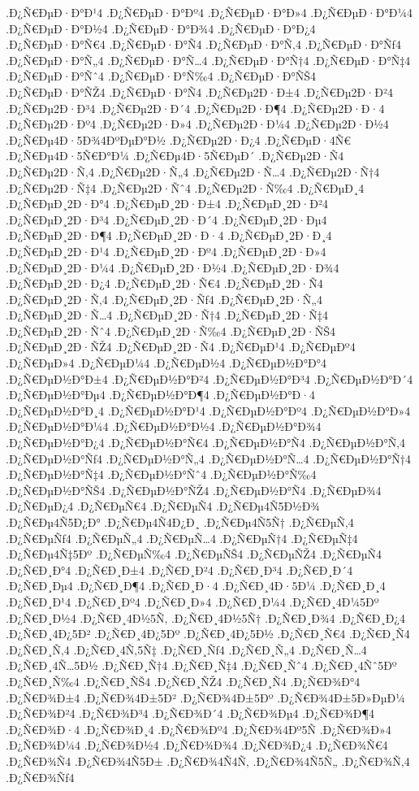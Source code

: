 {.Ð¿Ñ€ÐµÐ·Ð°Ð¹4
.Ð¿Ñ€ÐµÐ·Ð°Ðº4
.Ð¿Ñ€ÐµÐ·Ð°Ð»4
.Ð¿Ñ€ÐµÐ·Ð°Ð¼4
.Ð¿Ñ€ÐµÐ·Ð°Ð½4
.Ð¿Ñ€ÐµÐ·Ð°Ð¾4
.Ð¿Ñ€ÐµÐ·Ð°Ð¿4
.Ð¿Ñ€ÐµÐ·Ð°Ñ€4
.Ð¿Ñ€ÐµÐ·Ð°Ñ4
.Ð¿Ñ€ÐµÐ·Ð°Ñ‚4
.Ð¿Ñ€ÐµÐ·Ð°Ñƒ4
.Ð¿Ñ€ÐµÐ·Ð°Ñ„4
.Ð¿Ñ€ÐµÐ·Ð°Ñ…4
.Ð¿Ñ€ÐµÐ·Ð°Ñ†4
.Ð¿Ñ€ÐµÐ·Ð°Ñ‡4
.Ð¿Ñ€ÐµÐ·Ð°Ñˆ4
.Ð¿Ñ€ÐµÐ·Ð°Ñ‰4
.Ð¿Ñ€ÐµÐ·Ð°ÑŠ4
.Ð¿Ñ€ÐµÐ·Ð°ÑŽ4
.Ð¿Ñ€ÐµÐ·Ð°Ñ4
.Ð¿Ñ€Ðµ2Ð·Ð±4
.Ð¿Ñ€Ðµ2Ð·Ð²4
.Ð¿Ñ€Ðµ2Ð·Ð³4
.Ð¿Ñ€Ðµ2Ð·Ð´4
.Ð¿Ñ€Ðµ2Ð·Ð¶4
.Ð¿Ñ€Ðµ2Ð·Ð·4
.Ð¿Ñ€Ðµ2Ð·Ðº4
.Ð¿Ñ€Ðµ2Ð·Ð»4
.Ð¿Ñ€Ðµ2Ð·Ð¼4
.Ð¿Ñ€Ðµ2Ð·Ð½4
.Ð¿Ñ€Ðµ4Ð·5Ð¾4ÐºÐµÐ°Ð½
.Ð¿Ñ€Ðµ2Ð·Ð¿4
.Ð¿Ñ€ÐµÐ·4Ñ€
.Ð¿Ñ€Ðµ4Ð·5Ñ€Ð°Ð¼
.Ð¿Ñ€Ðµ4Ð·5Ñ€ÐµÐ´
.Ð¿Ñ€Ðµ2Ð·Ñ4
.Ð¿Ñ€Ðµ2Ð·Ñ‚4
.Ð¿Ñ€Ðµ2Ð·Ñ„4
.Ð¿Ñ€Ðµ2Ð·Ñ…4
.Ð¿Ñ€Ðµ2Ð·Ñ†4
.Ð¿Ñ€Ðµ2Ð·Ñ‡4
.Ð¿Ñ€Ðµ2Ð·Ñˆ4
.Ð¿Ñ€Ðµ2Ð·Ñ‰4
.Ð¿Ñ€ÐµÐ¸4
.Ð¿Ñ€ÐµÐ¸2Ð·Ð°4
.Ð¿Ñ€ÐµÐ¸2Ð·Ð±4
.Ð¿Ñ€ÐµÐ¸2Ð·Ð²4
.Ð¿Ñ€ÐµÐ¸2Ð·Ð³4
.Ð¿Ñ€ÐµÐ¸2Ð·Ð´4
.Ð¿Ñ€ÐµÐ¸2Ð·Ðµ4
.Ð¿Ñ€ÐµÐ¸2Ð·Ð¶4
.Ð¿Ñ€ÐµÐ¸2Ð·Ð·4
.Ð¿Ñ€ÐµÐ¸2Ð·Ð¸4
.Ð¿Ñ€ÐµÐ¸2Ð·Ð¹4
.Ð¿Ñ€ÐµÐ¸2Ð·Ðº4
.Ð¿Ñ€ÐµÐ¸2Ð·Ð»4
.Ð¿Ñ€ÐµÐ¸2Ð·Ð¼4
.Ð¿Ñ€ÐµÐ¸2Ð·Ð½4
.Ð¿Ñ€ÐµÐ¸2Ð·Ð¾4
.Ð¿Ñ€ÐµÐ¸2Ð·Ð¿4
.Ð¿Ñ€ÐµÐ¸2Ð·Ñ€4
.Ð¿Ñ€ÐµÐ¸2Ð·Ñ4
.Ð¿Ñ€ÐµÐ¸2Ð·Ñ‚4
.Ð¿Ñ€ÐµÐ¸2Ð·Ñƒ4
.Ð¿Ñ€ÐµÐ¸2Ð·Ñ„4
.Ð¿Ñ€ÐµÐ¸2Ð·Ñ…4
.Ð¿Ñ€ÐµÐ¸2Ð·Ñ†4
.Ð¿Ñ€ÐµÐ¸2Ð·Ñ‡4
.Ð¿Ñ€ÐµÐ¸2Ð·Ñˆ4
.Ð¿Ñ€ÐµÐ¸2Ð·Ñ‰4
.Ð¿Ñ€ÐµÐ¸2Ð·ÑŠ4
.Ð¿Ñ€ÐµÐ¸2Ð·ÑŽ4
.Ð¿Ñ€ÐµÐ¸2Ð·Ñ4
.Ð¿Ñ€ÐµÐ¹4
.Ð¿Ñ€ÐµÐº4
.Ð¿Ñ€ÐµÐ»4
.Ð¿Ñ€ÐµÐ¼4
.Ð¿Ñ€ÐµÐ½4
.Ð¿Ñ€ÐµÐ½Ð°Ð°4
.Ð¿Ñ€ÐµÐ½Ð°Ð±4
.Ð¿Ñ€ÐµÐ½Ð°Ð²4
.Ð¿Ñ€ÐµÐ½Ð°Ð³4
.Ð¿Ñ€ÐµÐ½Ð°Ð´4
.Ð¿Ñ€ÐµÐ½Ð°Ðµ4
.Ð¿Ñ€ÐµÐ½Ð°Ð¶4
.Ð¿Ñ€ÐµÐ½Ð°Ð·4
.Ð¿Ñ€ÐµÐ½Ð°Ð¸4
.Ð¿Ñ€ÐµÐ½Ð°Ð¹4
.Ð¿Ñ€ÐµÐ½Ð°Ðº4
.Ð¿Ñ€ÐµÐ½Ð°Ð»4
.Ð¿Ñ€ÐµÐ½Ð°Ð¼4
.Ð¿Ñ€ÐµÐ½Ð°Ð½4
.Ð¿Ñ€ÐµÐ½Ð°Ð¾4
.Ð¿Ñ€ÐµÐ½Ð°Ð¿4
.Ð¿Ñ€ÐµÐ½Ð°Ñ€4
.Ð¿Ñ€ÐµÐ½Ð°Ñ4
.Ð¿Ñ€ÐµÐ½Ð°Ñ‚4
.Ð¿Ñ€ÐµÐ½Ð°Ñƒ4
.Ð¿Ñ€ÐµÐ½Ð°Ñ„4
.Ð¿Ñ€ÐµÐ½Ð°Ñ…4
.Ð¿Ñ€ÐµÐ½Ð°Ñ†4
.Ð¿Ñ€ÐµÐ½Ð°Ñ‡4
.Ð¿Ñ€ÐµÐ½Ð°Ñˆ4
.Ð¿Ñ€ÐµÐ½Ð°Ñ‰4
.Ð¿Ñ€ÐµÐ½Ð°ÑŠ4
.Ð¿Ñ€ÐµÐ½Ð°ÑŽ4
.Ð¿Ñ€ÐµÐ½Ð°Ñ4
.Ð¿Ñ€ÐµÐ¾4
.Ð¿Ñ€ÐµÐ¿4
.Ð¿Ñ€ÐµÑ€4
.Ð¿Ñ€ÐµÑ4
.Ð¿Ñ€Ðµ4Ñ5Ð½Ð¾
.Ð¿Ñ€Ðµ4Ñ5Ð¿Ð°
.Ð¿Ñ€Ðµ4Ñ4Ð¿Ð¸
.Ð¿Ñ€Ðµ4Ñ5Ñ†
.Ð¿Ñ€ÐµÑ‚4
.Ð¿Ñ€ÐµÑƒ4
.Ð¿Ñ€ÐµÑ„4
.Ð¿Ñ€ÐµÑ…4
.Ð¿Ñ€ÐµÑ†4
.Ð¿Ñ€ÐµÑ‡4
.Ð¿Ñ€Ðµ4Ñ‡5Ðº
.Ð¿Ñ€ÐµÑ‰4
.Ð¿Ñ€ÐµÑŠ4
.Ð¿Ñ€ÐµÑŽ4
.Ð¿Ñ€ÐµÑ4
.Ð¿Ñ€Ð¸Ð°4
.Ð¿Ñ€Ð¸Ð±4
.Ð¿Ñ€Ð¸Ð²4
.Ð¿Ñ€Ð¸Ð³4
.Ð¿Ñ€Ð¸Ð´4
.Ð¿Ñ€Ð¸Ðµ4
.Ð¿Ñ€Ð¸Ð¶4
.Ð¿Ñ€Ð¸Ð·4
.Ð¿Ñ€Ð¸4Ð·5Ð¼
.Ð¿Ñ€Ð¸Ð¸4
.Ð¿Ñ€Ð¸Ð¹4
.Ð¿Ñ€Ð¸Ðº4
.Ð¿Ñ€Ð¸Ð»4
.Ð¿Ñ€Ð¸Ð¼4
.Ð¿Ñ€Ð¸4Ð¼5Ðº
.Ð¿Ñ€Ð¸Ð½4
.Ð¿Ñ€Ð¸4Ð½5Ñ‚
.Ð¿Ñ€Ð¸4Ð½5Ñ†
.Ð¿Ñ€Ð¸Ð¾4
.Ð¿Ñ€Ð¸Ð¿4
.Ð¿Ñ€Ð¸4Ð¿5Ð²
.Ð¿Ñ€Ð¸4Ð¿5Ðº
.Ð¿Ñ€Ð¸4Ð¿5Ð½
.Ð¿Ñ€Ð¸Ñ€4
.Ð¿Ñ€Ð¸Ñ4
.Ð¿Ñ€Ð¸Ñ‚4
.Ð¿Ñ€Ð¸4Ñ‚5Ñ‡
.Ð¿Ñ€Ð¸Ñƒ4
.Ð¿Ñ€Ð¸Ñ„4
.Ð¿Ñ€Ð¸Ñ…4
.Ð¿Ñ€Ð¸4Ñ…5Ð½
.Ð¿Ñ€Ð¸Ñ†4
.Ð¿Ñ€Ð¸Ñ‡4
.Ð¿Ñ€Ð¸Ñˆ4
.Ð¿Ñ€Ð¸4Ñˆ5Ðº
.Ð¿Ñ€Ð¸Ñ‰4
.Ð¿Ñ€Ð¸ÑŠ4
.Ð¿Ñ€Ð¸ÑŽ4
.Ð¿Ñ€Ð¸Ñ4
.Ð¿Ñ€Ð¾Ð°4
.Ð¿Ñ€Ð¾Ð±4
.Ð¿Ñ€Ð¾4Ð±5Ð²
.Ð¿Ñ€Ð¾4Ð±5Ðº
.Ð¿Ñ€Ð¾4Ð±5Ð»ÐµÐ¼
.Ð¿Ñ€Ð¾Ð²4
.Ð¿Ñ€Ð¾Ð³4
.Ð¿Ñ€Ð¾Ð´4
.Ð¿Ñ€Ð¾Ðµ4
.Ð¿Ñ€Ð¾Ð¶4
.Ð¿Ñ€Ð¾Ð·4
.Ð¿Ñ€Ð¾Ð¸4
.Ð¿Ñ€Ð¾Ðº4
.Ð¿Ñ€Ð¾4Ðº5Ñ
.Ð¿Ñ€Ð¾Ð»4
.Ð¿Ñ€Ð¾Ð¼4
.Ð¿Ñ€Ð¾Ð½4
.Ð¿Ñ€Ð¾Ð¾4
.Ð¿Ñ€Ð¾Ð¿4
.Ð¿Ñ€Ð¾Ñ€4
.Ð¿Ñ€Ð¾Ñ4
.Ð¿Ñ€Ð¾4Ñ5Ð±
.Ð¿Ñ€Ð¾4Ñ4Ñ‚
.Ð¿Ñ€Ð¾4Ñ5Ñ„
.Ð¿Ñ€Ð¾Ñ‚4
.Ð¿Ñ€Ð¾Ñƒ4
}
